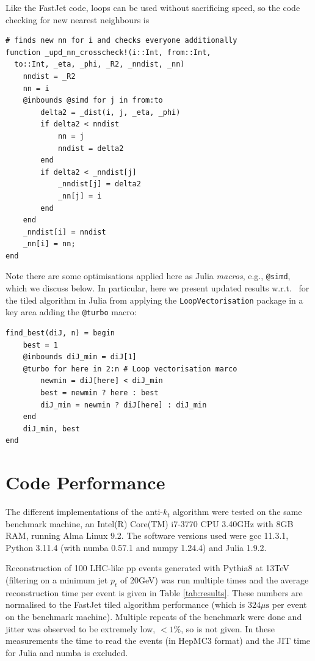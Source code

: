 \documentclass{webofc}
\begin{document}
Like the FastJet code, loops can be used without sacrificing speed, so the code checking for new nearest neighbours is

\begin{verbatim}
# finds new nn for i and checks everyone additionally
function _upd_nn_crosscheck!(i::Int, from::Int, 
  to::Int, _eta, _phi, _R2, _nndist, _nn)
    nndist = _R2
    nn = i
    @inbounds @simd for j in from:to
        delta2 = _dist(i, j, _eta, _phi)
        if delta2 < nndist
            nn = j
            nndist = delta2
        end
        if delta2 < _nndist[j]
            _nndist[j] = delta2
            _nn[j] = i
        end
    end
    _nndist[i] = nndist
    _nn[i] = nn;
end
\end{verbatim}

Note there are some optimisations applied here as Julia \emph{macros}, e.g.,
\texttt{@simd}, which we discuss below. In particular, here we present
updated results w.r.t.~\cite{polyglot-jets-conference} for the tiled algorithm in
Julia from applying the \texttt{LoopVectorisation} package in a key area adding
the \texttt{@turbo} macro:

\begin{verbatim}
find_best(diJ, n) = begin
    best = 1
    @inbounds diJ_min = diJ[1]
    @turbo for here in 2:n # Loop vectorisation marco
        newmin = diJ[here] < diJ_min
        best = newmin ? here : best
        diJ_min = newmin ? diJ[here] : diJ_min
    end
    diJ_min, best
end
\end{verbatim}

\section{Code Performance}
\label{sec:performance}

The different implementations of the anti-$k_t$ algorithm were tested on the
same benchmark machine, an Intel(R) Core(TM) i7-3770 CPU \@ 3.40GHz with 8GB RAM, running
Alma Linux 9.2. The software versions used were gcc 11.3.1, Python 3.11.4 (with
numba 0.57.1 and numpy 1.24.4) and Julia 1.9.2.

Reconstruction of 100 LHC-like pp events generated with Pythia8 at 13TeV
(filtering on a minimum jet $p_t$ of 20GeV) was run multiple times and the
average reconstruction time per event is given in Table \ref{tab:results}. These
numbers are normalised to the FastJet tiled algorithm performance (which is
$324\mu \mathrm{s}$ per event on the benchmark machine). Multiple repeats of the
benchmark were done and jitter was observed to be extremely low, $<1\%$, so is
not given. In these measurements the time to read the events (in HepMC3 format)
and the JIT time for Julia and numba is excluded.
\end{document}

